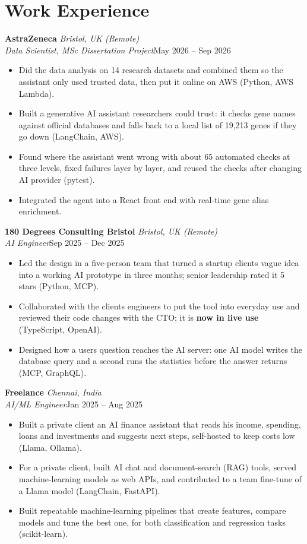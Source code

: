 \documentclass[a4paper,11pt]{article}
\newcommand{\role}[4]{%
  \textbf{#1}{\color{muted}\,\textperiodcentered\,\textit{#2}}\\
  \textit{#4}\hfill{\color{muted}#3}\par}
\newcommand{\gap}{\vspace{5pt}}
\newcommand{\num}[1]{\textbf{#1}}   %
\begin{document}
\section{Work Experience}
\role{AstraZeneca}{Bristol, UK (Remote)}{May 2026 – Sep 2026}{Data Scientist, MSc Dissertation Project}
\begin{itemize}
  \item Did the data analysis on 14 research datasets and combined them so the assistant only used trusted data, then put it online on AWS (Python, AWS Lambda).
  \item Built a generative AI assistant researchers could trust: it checks gene names against official databases and falls back to a local list of 19,213 genes if they go down (LangChain, AWS).
  \item Found where the assistant went wrong with about 65 automated checks at three levels, fixed failures layer by layer, and reused the checks after changing AI provider (pytest).
  \item Integrated the agent into a React front end with real-time gene alias enrichment.
\end{itemize}
\gap
{}
\role{180 Degrees Consulting Bristol}{Bristol, UK (Remote)}{Sep 2025 – Dec 2025}{AI Engineer}
\begin{itemize}
  \item Led the design in a five-person team that turned a startup client\textquotesingle{}s vague idea into a working AI prototype in three months; senior leadership rated it 5 stars (Python, MCP).
  \item Collaborated with the client\textquotesingle{}s engineers to put the tool into everyday use and reviewed their code changes with the CTO; it is \num{now in live use} (TypeScript, OpenAI).
  \item Designed how a user\textquotesingle{}s question reaches the AI server: one AI model writes the database query and a second runs the statistics before the answer returns (MCP, GraphQL).
\end{itemize}
\gap
{}
\role{Freelance}{Chennai, India}{Jan 2025 – Aug 2025}{AI/ML Engineer}
\begin{itemize}
  \item Built a private client an AI finance assistant that reads his income, spending, loans and investments and suggests next steps, self-hosted to keep costs low (Llama, Ollama).
  \item For a private client, built AI chat and document-search (RAG) tools, served machine-learning models as web APIs, and contributed to a team fine-tune of a Llama model (LangChain, FastAPI).
  \item Built repeatable machine-learning pipelines that create features, compare models and tune the best one, for both classification and regression tasks (scikit-learn).
\end{itemize}
\end{document}

